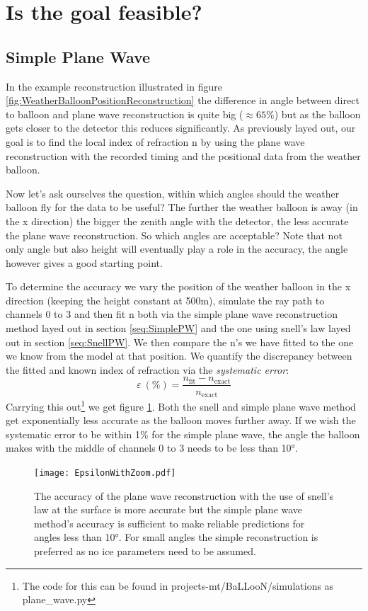 \section{Is the goal feasible?}
\subsection{Simple Plane Wave}
In the example reconstruction illustrated in figure
\ref{fig:WeatherBalloonPositionReconstruction} the difference in angle between
direct to balloon and plane wave reconstruction is quite big
($\approx 65\%$) but as the balloon gets closer to the detector this reduces
significantly. As previously layed out, our goal is to find the local index of refraction n by using the
plane wave reconstruction with the recorded timing and the positional data from
the weather balloon.

Now let's ask ourselves the question, within which angles should the
weather balloon fly for the data to be useful?  The
further the weather balloon is away (in the x direction) the bigger the zenith
angle with the detector, the less accurate the plane wave reconstruction.  So
which angles are acceptable? Note that not only angle but also height will eventually
play a role in the accuracy, the angle however gives a good starting point.

To determine the accuracy we vary the position of the weather balloon in the x direction (keeping the
height constant at 500m), simulate the ray path to channels 0 to 3 and then fit n
both via the simple plane wave reconstruction method layed out in section \ref{seq:SimplePW} and
the one using snell's law layed out in section \ref{seq:SnellPW}.
We then compare the n's we have fitted  to the
one we know from the model at that position.  We quantify the discrepancy
between the fitted and known index of refraction via the
\textit{systematic error}:
\begin{equation}
  \varepsilon\ (\%) = \frac{n_\text{fit} - n_{\text{exact}}}{n_{\text{exact}}}
\end{equation}
Carrying this out\footnote{The code for this can be found in
projects-mt/BaLLooN/simulations as plane\_wave.py} we get figure
\ref{fig:EpsilonIFODirect}. Both the snell and simple plane wave method get
exponentially less accurate as the balloon moves further away.  If we wish the
systematic error to be within 1\% for the simple plane wave, the angle the
balloon makes with the middle of channels 0 to 3 needs to be less than 10°.
\begin{figure}
	\centering
	\texttt{[image: EpsilonWithZoom.pdf]}
	\caption{The accuracy of the plane wave reconstruction with the use of snell's law at the surface is more 
  accurate but the simple plane wave method's accuracy is sufficient to make reliable
predictions for angles less than 10°. For small angles the simple reconstruction is preferred as no ice 
parameters need to be assumed.}
	\label{fig:EpsilonIFODirect}
\end{figure}

